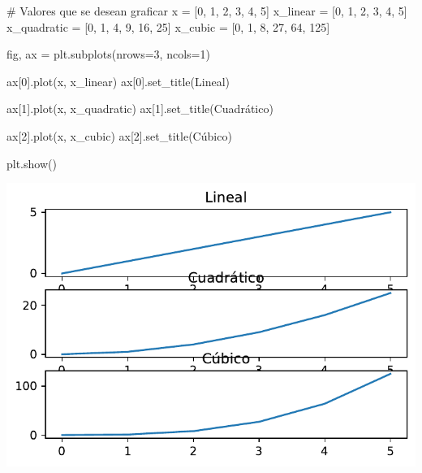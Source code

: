 \documentclass[
  letterpaper,
  DIV=11,
  numbers=noendperiod]{scrreprt}
\newenvironment{Shaded}{\begin{snugshade}}{\end{snugshade}}
\newcommand{\CommentTok}[1]{\textcolor[rgb]{0.37,0.37,0.37}{#1}}
\newcommand{\DecValTok}[1]{\textcolor[rgb]{0.68,0.00,0.00}{#1}}
\newcommand{\NormalTok}[1]{\textcolor[rgb]{0.00,0.23,0.31}{#1}}
\newcommand{\OperatorTok}[1]{\textcolor[rgb]{0.37,0.37,0.37}{#1}}
\newcommand{\StringTok}[1]{\textcolor[rgb]{0.13,0.47,0.30}{#1}}
\begin{document}
\begin{Shaded}
\begin{Highlighting}[]
\CommentTok{\# Valores que se desean graficar}
\NormalTok{x }\OperatorTok{=}\NormalTok{ [}\DecValTok{0}\NormalTok{, }\DecValTok{1}\NormalTok{, }\DecValTok{2}\NormalTok{, }\DecValTok{3}\NormalTok{, }\DecValTok{4}\NormalTok{, }\DecValTok{5}\NormalTok{]}
\NormalTok{x\_linear }\OperatorTok{=}\NormalTok{ [}\DecValTok{0}\NormalTok{, }\DecValTok{1}\NormalTok{, }\DecValTok{2}\NormalTok{, }\DecValTok{3}\NormalTok{, }\DecValTok{4}\NormalTok{, }\DecValTok{5}\NormalTok{]}
\NormalTok{x\_quadratic }\OperatorTok{=}\NormalTok{ [}\DecValTok{0}\NormalTok{, }\DecValTok{1}\NormalTok{, }\DecValTok{4}\NormalTok{, }\DecValTok{9}\NormalTok{, }\DecValTok{16}\NormalTok{, }\DecValTok{25}\NormalTok{]}
\NormalTok{x\_cubic }\OperatorTok{=}\NormalTok{ [}\DecValTok{0}\NormalTok{, }\DecValTok{1}\NormalTok{, }\DecValTok{8}\NormalTok{, }\DecValTok{27}\NormalTok{, }\DecValTok{64}\NormalTok{, }\DecValTok{125}\NormalTok{]}

\NormalTok{fig, ax }\OperatorTok{=}\NormalTok{ plt.subplots(nrows}\OperatorTok{=}\DecValTok{3}\NormalTok{, ncols}\OperatorTok{=}\DecValTok{1}\NormalTok{)}

\NormalTok{ax[}\DecValTok{0}\NormalTok{].plot(x, x\_linear)}
\NormalTok{ax[}\DecValTok{0}\NormalTok{].set\_title(}\StringTok{\textquotesingle{}Lineal\textquotesingle{}}\NormalTok{)}

\NormalTok{ax[}\DecValTok{1}\NormalTok{].plot(x, x\_quadratic)}
\NormalTok{ax[}\DecValTok{1}\NormalTok{].set\_title(}\StringTok{\textquotesingle{}Cuadrático\textquotesingle{}}\NormalTok{)}

\NormalTok{ax[}\DecValTok{2}\NormalTok{].plot(x, x\_cubic)}
\NormalTok{ax[}\DecValTok{2}\NormalTok{].set\_title(}\StringTok{\textquotesingle{}Cúbico\textquotesingle{}}\NormalTok{)}

\NormalTok{plt.show()}
\end{Highlighting}
\end{Shaded}

\includegraphics{unidad_6_files/figure-pdf/cell-124-output-1.pdf}
\end{document}
